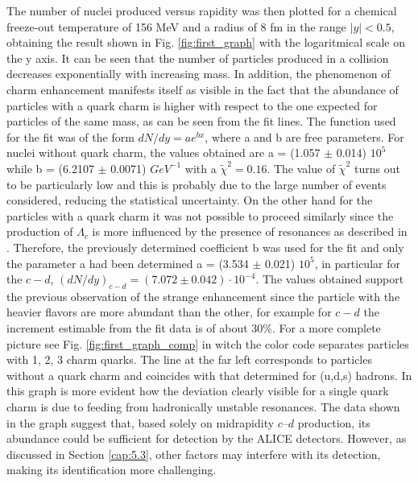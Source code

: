 \documentclass[12pt,a4paper]{book}
\begin{document}
	The number of nuclei produced versus rapidity was then plotted for a chemical freeze-out temperature of 156 MeV and a radius of 8 fm in the range $|y| <0.5$, obtaining the result shown in Fig. \ref{fig:first_graph} with the logaritmical scale on the y axis. It can be seen that the number of particles produced in a collision decreases exponentially with increasing mass. In addition, the phenomenon of charm enhancement manifests itself as visible in the fact that the abundance of particles with a quark charm is higher with respect to the one expected for particles of the same mass, as can be seen from the fit lines. The function used for the fit was of the form $dN/dy= a e^{bx}$, where a and b are free parameters. For nuclei without quark charm, the values obtained are a = (1.057 $\pm$ 0.014) $10^5$ while b = (6.2107 $\pm$ 0.0071) $GeV^{-1}$ with a $\tilde{\chi}^2 = 0.16$. The value of $\tilde{\chi}^2$ turns out to be particularly low and this is probably due to the large number of events considered, reducing the statistical uncertainty. On the other hand for the particles with a quark charm it was not possible to proceed similarly since the production of $\Lambda_c$ is more influenced by the presence of resonances as described in \cite{Andronic_2021}. Therefore, the previously determined coefficient b was used for the fit and only the parameter a had been determined a = (3.534 $\pm$ 0.021) $10^5$, in particular for the $c-d$, $(dN/dy)_{c-d}= (7.072 \pm 0.042) \cdot 10^{-4}$. The values obtained support the previous observation of the strange enhancement since the particle with the heavier flavors are more abundant than the other, for example for $c-d$ the increment estimable from the fit data is of about 30\%. For a more complete picture see Fig. \ref{fig:first_graph_comp} in witch the color code separates particles with 1, 2, 3 charm quarks. The line at the far left corresponds to particles without a quark charm and coincides with that determined for (u,d,s) hadrons. In this graph is more evident how the deviation clearly visible for a single quark charm is due to feeding from hadronically unstable resonances. The data shown in the graph suggest that, based solely on midrapidity $c–d$ production, its abundance could be sufficient for detection by the ALICE detectors. However, as discussed in Section \ref{cap:5.3}, other factors may interfere with its detection, making its identification more challenging. 
\end{document}
